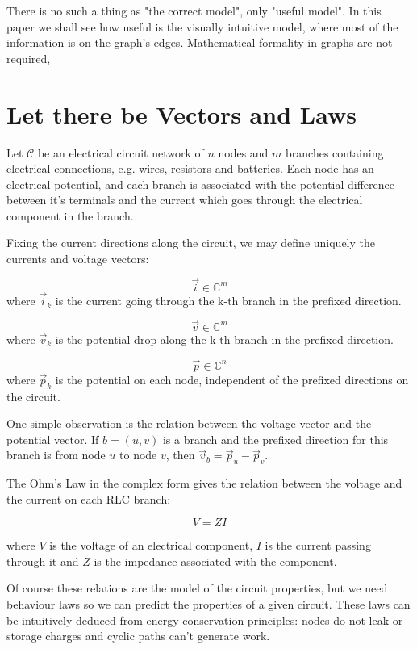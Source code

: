 \documentclass{comjnl}
\begin{document}
There is no such a thing as "the correct model", only "useful model". In this paper we shall see how useful is the visually intuitive model, where most of the information is on the graph's edges. Mathematical formality in graphs are not required, 

\section{Let there be Vectors and Laws}
Let $\mathcal{C}$ be an electrical circuit network of $n$ nodes and $m$ branches containing electrical connections, e.g. wires, resistors and batteries. Each node has an electrical potential, and each branch is associated with the potential difference between it's terminals and the current which goes through the electrical component in the branch.

Fixing the current directions along the circuit, we may define uniquely the currents and voltage vectors:
\begin{definition}
$$ \vec{i} \in \mathbb{C}^m$$ where $\vec{i}_k$ is the current going through the k-th branch in the prefixed direction.
\end{definition}
\begin{definition}
$$ \vec{v} \in \mathbb{C}^m$$ where $\vec{v}_k$ is the potential drop along the k-th branch in the prefixed direction.
\end{definition}
\begin{definition}
$$ \vec{p} \in \mathbb{C}^n$$ where $\vec{p}_k$ is the potential on each node, independent of the prefixed directions on the circuit.
\end{definition}

One simple observation is the relation between the voltage vector and the potential vector. If $b=(u,v)$ is a branch and the prefixed direction for this branch is from node $u$ to node $v$, then $\vec{v}_b = \vec{p}_u - \vec{p}_v$. 

The Ohm's Law in the complex form gives the relation between the voltage and the current on each RLC branch:
\begin{axiom}[Ohm]
$$V = ZI $$
\end{axiom}
where $V$ is the voltage of an electrical component, $I$ is the current passing through it and $Z$ is the impedance associated with the component. 

Of course these relations are the model of the circuit properties, but we need behaviour laws so we can predict the properties of a given circuit. These laws can be intuitively deduced from energy conservation principles: nodes do not leak or storage charges and cyclic paths can't generate work.
\end{document}
